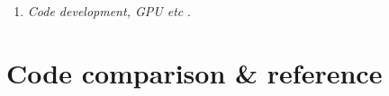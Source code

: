 \documentclass[12pt]{article}
\begin{document}
\begin{enumerate}
\begin{enumerate}
{2019OLEB...49...49B,%
2019PhFl...31e6102M,%
2016A&A...587A..90B,%
2015AtmRe.153...49B,%
2015PhRvE..91b1001C,%
2014A&A...571A..68B,%
2011arXiv1110.1163T,%
2011PhRvE..83a6304B,%
2011JCoPh.230....1B,%
2004IJAsB...3..209B%
}.

\item
{\em Code development, GPU etc} \citep{
2026A&A...714A.100P,%
2023RNAAS...7...69L,%
2021JOSS....6.2807P,%
2022ParC..11102904P,%
2017CoPhC.217...11P%
}.

\end{enumerate}
\end{enumerate}

\section{Code comparison \& reference}
\end{document}

